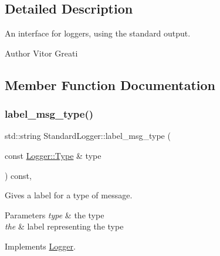 \subsection{Detailed Description}
An interface for loggers, using the standard output. 

\begin{DoxyAuthor}{Author}
Vitor Greati 
\end{DoxyAuthor}


\subsection{Member Function Documentation}
\mbox{\label{class_standard_logger_a5803969715008363869dfd47326790bb}} 
\subsubsection{\texorpdfstring{label\_msg\_type()}{label\_msg\_type()}}
{\footnotesize\ttfamily std\+::string Standard\+Logger\+::label\+\_\+msg\+\_\+type (\begin{DoxyParamCaption}\item[{const \mbox{\hyperlink{class_logger_acd39cb578d7a6750c959f2fad38d8db6}{Logger\+::\+Type}} \&}]{type }\end{DoxyParamCaption}) const\hspace{0.3cm}{\ttfamily [inline]}, {\ttfamily [virtual]}}



Gives a label for a type of message. 


\begin{DoxyParams}{Parameters}
{\em type} & the type \\
\hline
{\em the} & label representing the type \\
\hline
\end{DoxyParams}


Implements \mbox{\hyperlink{class_logger_abe4434e4ae0efd8b41cb2a61458a710d}{Logger}}.

\mbox{\label{class_standard_logger_a11c29fca1b05d7ff331b298e9c91cd81}} 
